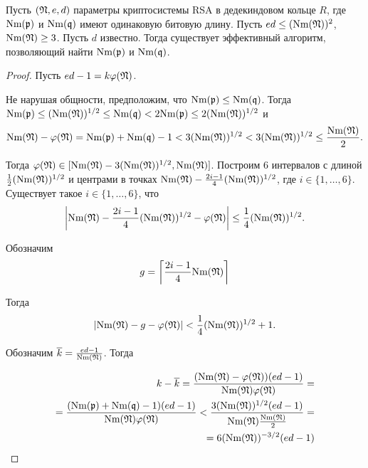 \documentclass[_00_dissertation.tex]{subfiles}
\begin{document}
\begin{theorem}\label{theorem:d_is_known_2}
    Пусть $(\mathfrak{N}, e, d)$ параметры криптосистемы RSA в дедекиндовом кольце $R$, где $\textrm{Nm}(\mathfrak{p})$ и $\textrm{Nm}(\mathfrak{q})$ имеют одинаковую битовую длину.
    Пусть $e d \le (\textrm{Nm}(\mathfrak{N}))^2$, $\textrm{Nm}(\mathfrak{N}) \ge 3$.
    Пусть $d$ известно.
    Тогда существует эффективный алгоритм, позволяющий найти $\textrm{Nm}(\mathfrak{p})$ и $\textrm{Nm}(\mathfrak{q})$.
\end{theorem}
\begin{proof}
    Пусть $e d - 1 = k\varphi(\mathfrak{N})$.

    Не нарушая общности, предположим, что $\textrm{Nm}(\mathfrak{p}) \le \textrm{Nm}(\mathfrak{q})$.
    Тогда $\textrm{Nm}(\mathfrak{p}) \le (\textrm{Nm}(\mathfrak{N}))^{1/2} \le \textrm{Nm}(\mathfrak{q}) < 2\textrm{Nm}(\mathfrak{p}) \le 2(\textrm{Nm}(\mathfrak{N}))^{1/2}$ и
    \begin{equation*}
        \textrm{Nm}(\mathfrak{N}) - \varphi(\mathfrak{N}) = \textrm{Nm}(\mathfrak{p}) + \textrm{Nm}(\mathfrak{q}) - 1 < 3(\textrm{Nm}(\mathfrak{N}))^{1/2} < 3(\textrm{Nm}(\mathfrak{N}))^{1/2} \le \frac{\textrm{Nm}(\mathfrak{N})}{2}.
    \end{equation*}

    Тогда $\varphi(\mathfrak{N}) \in [\textrm{Nm}(\mathfrak{N})-3(\textrm{Nm}(\mathfrak{N}))^{1/2}, \textrm{Nm}(\mathfrak{N})]$.
    Построим $6$ интервалов с длиной $\frac{1}{2}(\textrm{Nm}(\mathfrak{N}))^{1/2}$ и центрами в точках $\textrm{Nm}(\mathfrak{N}) - \frac{2i-1}{4}(\textrm{Nm}(\mathfrak{N}))^{1/2}$, где $i \in \{1, \ldots, 6\}$.
    Существует такое $i \in \{1, \ldots, 6\}$, что
    \begin{equation*}
        \left|
            \textrm{Nm}(\mathfrak{N})-\frac{2i-1}{4}(\textrm{Nm}(\mathfrak{N}))^{1/2}-\varphi(\mathfrak{N})
        \right| \le \frac{1}{4}(\textrm{Nm}(\mathfrak{N}))^{1/2}.
    \end{equation*}
  
    Обозначим
    \begin{equation*}
        g = \left\lceil
            \frac{2i-1}{4}\textrm{Nm}(\mathfrak{N})
        \right\rceil
    \end{equation*}

    Тогда
    \begin{equation*}
        \left|
            \textrm{Nm}(\mathfrak{N}) - g - \varphi(\mathfrak{N})
        \right| < \frac{1}{4}(\textrm{Nm}(\mathfrak{N}))^{1/2} + 1.
    \end{equation*}

    Обозначим $\overline{k} = \frac{ed-1}{\textrm{Nm}(\mathfrak{N})}$.
    Тогда

    \begin{equation*}
        \begin{split}
            k - \overline{k} =
            \frac{(\textrm{Nm}(\mathfrak{N})-\varphi(\mathfrak{N}))(ed-1)}{\textrm{Nm}(\mathfrak{N})\varphi(\mathfrak{N})} =\\
            = \frac{(\textrm{Nm}(\mathfrak{p})+\textrm{Nm}(\mathfrak{q})-1)(ed-1)}{\textrm{Nm}(\mathfrak{N})\varphi(\mathfrak{N})} < \frac{3(\textrm{Nm}(\mathfrak{N}))^{1/2}(ed-1)}{\textrm{Nm}(\mathfrak{N})\frac{\textrm{Nm}(\mathfrak{N})}{2}} =\\
            = 6(\textrm{Nm}(\mathfrak{N}))^{-3/2}(ed-1)
        \end{split}
    \end{equation*}
  

\end{proof}
\end{document}
